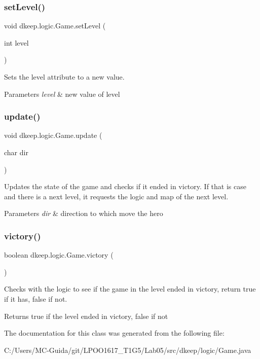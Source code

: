 \subsubsection{\texorpdfstring{set\+Level()}{setLevel()}}
{\footnotesize\ttfamily void dkeep.\+logic.\+Game.\+set\+Level (\begin{DoxyParamCaption}\item[{int}]{level }\end{DoxyParamCaption})}

Sets the level attribute to a new value. 
\begin{DoxyParams}{Parameters}
{\em level} & new value of level \\
\hline
\end{DoxyParams}
\mbox{\label{classdkeep_1_1logic_1_1_game_add0b32fc7d2370e0071ccdf85ee341e1}} 
\subsubsection{\texorpdfstring{update()}{update()}}
{\footnotesize\ttfamily void dkeep.\+logic.\+Game.\+update (\begin{DoxyParamCaption}\item[{char}]{dir }\end{DoxyParamCaption})}

Updates the state of the game and checks if it ended in victory. If that is case and there is a next level, it requests the logic and map of the next level. 
\begin{DoxyParams}{Parameters}
{\em dir} & direction to which move the hero \\
\hline
\end{DoxyParams}
\mbox{\label{classdkeep_1_1logic_1_1_game_af2953cb36d8db8ff068d0291f6c6dbba}} 
\subsubsection{\texorpdfstring{victory()}{victory()}}
{\footnotesize\ttfamily boolean dkeep.\+logic.\+Game.\+victory (\begin{DoxyParamCaption}{ }\end{DoxyParamCaption})}

Checks with the logic to see if the game in the level ended in victory, return true if it has, false if not. \begin{DoxyReturn}{Returns}
true if the level ended in victory, false if not 
\end{DoxyReturn}


The documentation for this class was generated from the following file\+:\begin{DoxyCompactItemize}
\item 
C\+:/\+Users/\+M\+C-\/\+Guida/git/\+L\+P\+O\+O1617\+\_\+\+T1\+G5/\+Lab05/src/dkeep/logic/Game.\+java\end{DoxyCompactItemize}
